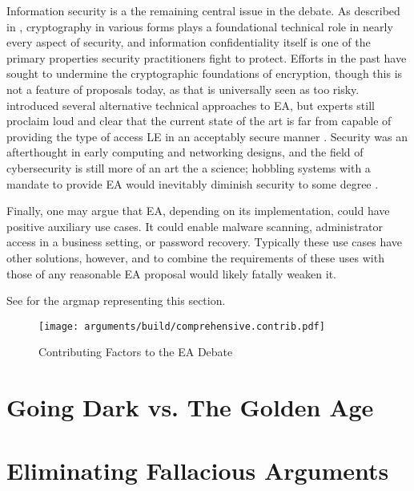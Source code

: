 Information security is a the remaining central issue in the debate. As described in ,
\ac{cryptography} in various forms plays a foundational technical role in nearly every aspect of security, and
information confidentiality itself is one of the primary properties security practitioners fight to protect. Efforts in
the past have sought to undermine the cryptographic foundations of encryption, though this is not a feature of proposals
today, as that is universally seen as too risky.  introduced several alternative technical
approaches to \ac{EA}, but experts still proclaim loud and clear that the current state of the art is far from capable
of providing the type of access \acl{LE} in an acceptably secure manner \cite{abelson_2015} \cite{abelson_risks_1997}.
Security was an afterthought in early computing and networking designs, and the field of cybersecurity is still more of
an art the a science; hobbling systems with a mandate to provide \ac{EA} would inevitably diminish security to some
degree \cite{abelson_2015}.

Finally, one may argue that \ac{EA}, depending on its implementation, could have positive auxiliary use cases. It could
enable malware scanning, administrator access in a business setting, or password recovery. Typically these use cases
have other solutions, however, and to combine the requirements of these uses with those of any reasonable \ac{EA}
proposal would likely fatally weaken it.

See  for the \ac{argmap} representing this section.

\begin{sidewaysfigure}
  \centering\CaptionFontSize
  \texttt{[image: arguments/build/comprehensive.contrib.pdf]}
  \caption[Contributing Factors to the EA Debate]{Contributing Factors to the EA Debate}
  \label{fig-args-contrib}
\end{sidewaysfigure}

\section{Going Dark vs. The Golden Age}


\section{Eliminating Fallacious Arguments}

